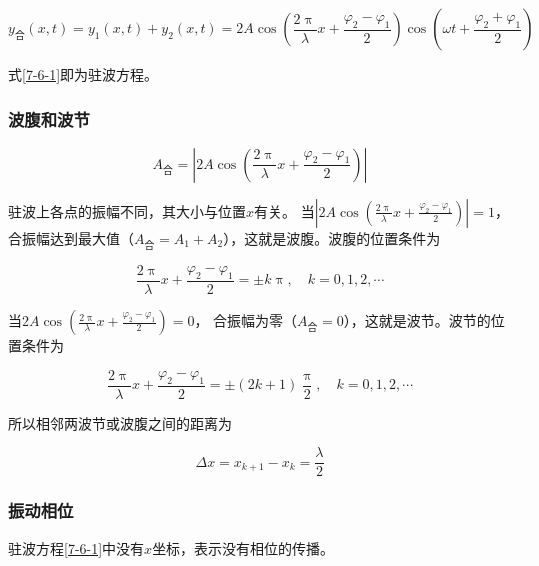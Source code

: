 \documentclass[
	12pt, %
	a4paper, %
]{myLegrandOrangeBook}
\begin{document}
    \begin{equation}
        y_{\text{合}}(x, t)=y_1(x, t)+y_2(x, t)=
        2 A \cos \left(\frac{2 \uppi}{\lambda} x+\frac{\varphi_2-\varphi_1}{2}\right) \cos \left(\omega t+\frac{\varphi_2+\varphi_1}{2}\right)
        \label{7-6-1}
    \end{equation}

    式\ref{7-6-1}即为驻波方程。

\subsubsection{波腹和波节}

    \begin{equation}
        A_{\text{合}}=\left|2 A \cos \left(\frac{2 \uppi}{\lambda} x+\frac{\varphi_2-\varphi_1}{2}\right)\right|
    \end{equation}

    驻波上各点的振幅不同，其大小与位置\(x \)有关。
    当\({\displaystyle \left|2 A \cos \left(\frac{2 \uppi}{\lambda} x+\frac{\varphi_2-\varphi_1}{2}\right)\right|=1}\)，
    合振幅达到最大值（\(A_{\text{合}} = A_1+A_2\)），这就是波腹。波腹的位置条件为

    \begin{equation}
        \frac{2 \uppi}{\lambda} x+\frac{\varphi_2-\varphi_1}{2}= \pm k \uppi, \quad k=0,1,2, \cdots
    \end{equation}

    当\({\displaystyle 2 A \cos \left(\frac{2 \uppi}{\lambda} x+\frac{\varphi_2-\varphi_1}{2}\right)=0}\)，
    合振幅为零（\(A_{\text{合}} = 0\)），这就是波节。波节的位置条件为

    \begin{equation}
        \frac{2 \uppi}{\lambda} x+\frac{\varphi_2-\varphi_1}{2}= \pm(2 k+1) \frac{\uppi}{2}, \quad k=0,1,2, \cdots
    \end{equation}

    所以相邻两波节或波腹之间的距离为

    \begin{equation}
        \Delta x=x_{k+1}-x_k=\frac{\lambda}{2}
    \end{equation}

\subsubsection{振动相位}

    驻波方程\ref{7-6-1}中没有\(x\)坐标，表示没有相位的传播。
\end{document}
